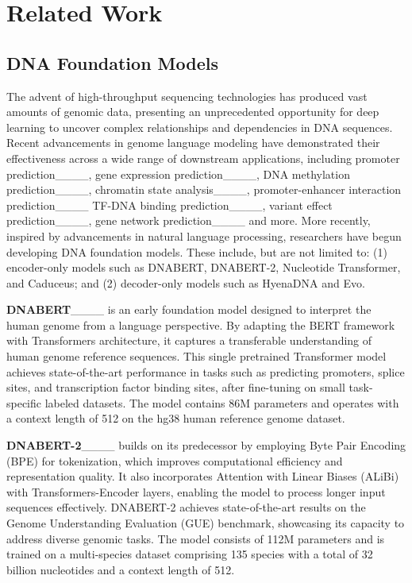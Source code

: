 \section{Related Work}
\subsection{DNA Foundation Models}

The advent of high-throughput sequencing technologies has produced vast amounts of genomic data, presenting an unprecedented opportunity for deep learning to uncover complex relationships and dependencies in DNA sequences. Recent advancements in genome language modeling have demonstrated their effectiveness across a wide range of downstream applications, including promoter prediction____, gene expression  prediction____, DNA methylation prediction____, chromatin state analysis____, promoter-enhancer interaction prediction____
TF-DNA binding prediction____, variant effect prediction____,
gene network prediction____ and more.
More recently, inspired by advancements in natural language processing, researchers have begun developing DNA foundation models. These include, but are not limited to: (1) encoder-only models such as DNABERT, DNABERT-2, Nucleotide Transformer,  and Caduceus; and (2) decoder-only models such as HyenaDNA and Evo.

\textbf{DNABERT}____ is an early foundation model designed to interpret the human genome from a language perspective. By adapting the BERT framework with Transformers architecture, it captures a transferable understanding of human genome reference sequences. This single pretrained Transformer model achieves state-of-the-art performance in tasks such as predicting promoters, splice sites, and transcription factor binding sites, after fine-tuning on small task-specific labeled datasets. The model contains 86M parameters and operates with a context length of 512 on the hg38 human reference genome dataset.

\textbf{DNABERT-2}____ builds on its predecessor by employing Byte Pair Encoding (BPE) for tokenization, which improves computational efficiency and representation quality. It also incorporates Attention with Linear Biases (ALiBi) with Transformers-Encoder layers, enabling the model to process longer input sequences effectively. DNABERT-2 achieves state-of-the-art results on the Genome Understanding Evaluation (GUE) benchmark, showcasing its capacity to address diverse genomic tasks. The model consists of 112M parameters and is trained on a multi-species dataset comprising 135 species with a total of 32 billion nucleotides and a context length of 512.

